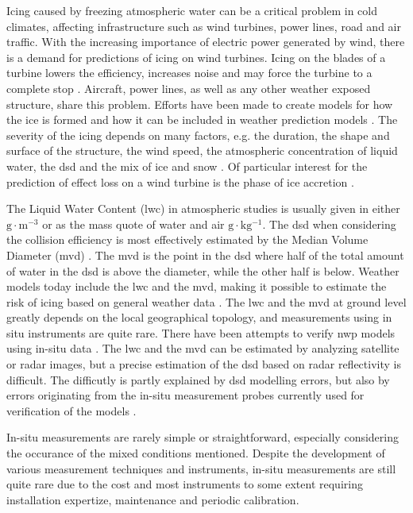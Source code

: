 Icing caused by freezing atmospheric water can be a critical problem in cold climates, affecting infrastructure such as wind turbines, power lines, road and air traffic. With the increasing importance of electric power generated by wind, there is a demand for predictions of icing on wind turbines. Icing on the blades of a turbine lowers the efficiency, increases noise and may force the turbine to a complete stop \cite{dalili2009,cost727,homo2012,jasin1998}. Aircraft, power lines, as well as any other weather exposed structure, share this problem. Efforts have been made to create models for how the ice is formed \cite{makk2000,makk2001,shin1992} and how it can be included in weather prediction models \cite{thomp2009,kring2011}. The severity of the icing depends on many factors, e.g. the duration, the shape and surface of the structure, the wind speed, the atmospheric concentration of liquid water, the \gls{dsd} and the mix of ice and snow \cite{kring2011,makk2000,makk2001,homo2010,han2012}. Of particular interest for the prediction of effect loss on a wind turbine is the phase of ice accretion \cite{davis2014}.

The Liquid Water Content (\gls{lwc}) in atmospheric studies is usually given in either $\mathrm{g\cdot m^{-3}}$ \cite{sein1998} or as the mass quote of water and air $\mathrm{g\cdot kg^{-1}}$. The \gls{dsd} when considering the collision efficiency is most effectively estimated by the Median Volume Diameter (\gls{mvd}) \cite{fins1988}. The \gls{mvd} is the point in the \gls{dsd} where half of the total amount of water in the \gls{dsd} is above the diameter, while the other half is below. Weather models today include the \gls{lwc} and the \gls{mvd}, making it possible to estimate the risk of icing based on general weather data \cite{thomp2009}. The \gls{lwc} and the \gls{mvd} at ground level greatly depends on the local geographical topology, and measurements using in situ instruments are quite rare. There have been attempts to verify \gls{nwp} models using in-situ data \cite{berg2013}. The \gls{lwc} and the \gls{mvd} can be estimated by analyzing satellite or radar images, but a precise estimation of the \gls{dsd} based on radar reflectivity is difficult. The difficutly is partly explained by \gls{dsd} modelling errors, but also by errors originating from the in-situ measurement probes currently used for verification of the models \cite{miles2000}. 

In-situ measurements are rarely simple or straightforward, especially considering the occurance of the mixed conditions mentioned. Despite the development of various measurement techniques and instruments, in-situ measurements are still quite rare due to the cost and most instruments to some extent requiring installation expertize, maintenance and periodic calibration.

